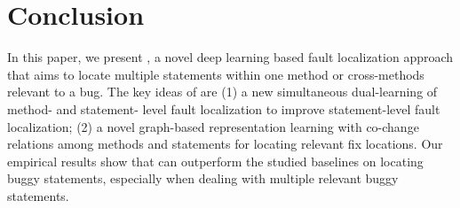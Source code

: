 \section{Conclusion}
In this paper, we present {\tool}, a novel deep learning based fault localization approach that aims to locate multiple statements within one method or cross-methods relevant to a bug. The key ideas of {\tool} are (1) a new simultaneous dual-learning of method- and statement- level fault localization to improve statement-level fault localization; (2) a novel graph-based representation learning with co-change relations among methods and statements for locating relevant fix locations. Our empirical results show that {\tool} can outperform the studied baselines on locating buggy statements, especially when dealing with multiple relevant buggy statements.  
